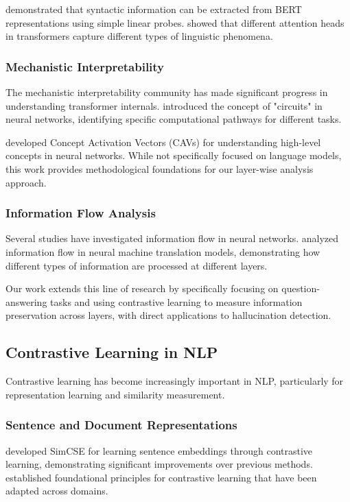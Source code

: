 \citet{hewitt2019structural} demonstrated that syntactic information can be extracted from BERT representations using simple linear probes. \citet{voita2019analyzing} showed that different attention heads in transformers capture different types of linguistic phenomena.

\subsubsection{Mechanistic Interpretability}
The mechanistic interpretability community has made significant progress in understanding transformer internals. \citet{olah2020zoom} introduced the concept of "circuits" in neural networks, identifying specific computational pathways for different tasks.

\citet{kim2018interpretability} developed Concept Activation Vectors (CAVs) for understanding high-level concepts in neural networks. While not specifically focused on language models, this work provides methodological foundations for our layer-wise analysis approach.

\subsubsection{Information Flow Analysis}
Several studies have investigated information flow in neural networks. \citet{voita2019information} analyzed information flow in neural machine translation models, demonstrating how different types of information are processed at different layers.

Our work extends this line of research by specifically focusing on question-answering tasks and using contrastive learning to measure information preservation across layers, with direct applications to hallucination detection.

\subsection{Contrastive Learning in NLP}
\label{subsec:contrastive_nlp}

Contrastive learning has become increasingly important in NLP, particularly for representation learning and similarity measurement.

\subsubsection{Sentence and Document Representations}
\citet{gao2021simcse} developed SimCSE for learning sentence embeddings through contrastive learning, demonstrating significant improvements over previous methods. \citet{chen2020simclr} established foundational principles for contrastive learning that have been adapted across domains.

